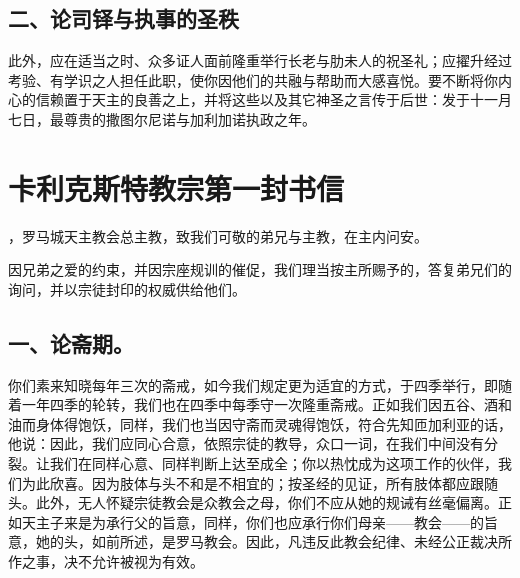 
\subsection{二、论司铎与执事的圣秩}

此外，应在适当之时、众多证人面前隆重举行长老与肋未人的祝圣礼；应擢升经过考验、有学识之人担任此职，使你因他们的共融与帮助而大感喜悦。要不断将你内心的信赖置于天主的良善之上，并将这些以及其它神圣之言传于后世：发于十一月七日，最尊贵的撒图尔尼诺与加利加诺执政之年。\par


\section{卡利克斯特教宗第一封书信}

\par

，罗马城天主教会总主教，致我们可敬的弟兄与主教，在主内问安。\par

因兄弟之爱的约束，并因宗座规训的催促，我们理当按主所赐予的，答复弟兄们的询问，并以宗徒封印的权威供给他们。\par


\subsection{一、论斋期。}

你们素来知晓每年三次的斋戒，如今我们规定更为适宜的方式，于四季举行，即随着一年四季的轮转，我们也在四季中每季守一次隆重斋戒。正如我们因五谷、酒和油而身体得饱饫，同样，我们也当因守斋而灵魂得饱饫，符合先知匝加利亚的话，他说：因此，我们应同心合意，依照宗徒的教导，众口一词，在我们中间没有分裂。让我们在同样心意、同样判断上达至成全；你以热忱成为这项工作的伙伴，我们为此欣喜。因为肢体与头不和是不相宜的；按圣经的见证，所有肢体都应跟随头。此外，无人怀疑宗徒教会是众教会之母，你们不应从她的规诫有丝毫偏离。正如天主子来是为承行父的旨意，同样，你们也应承行你们母亲——教会——的旨意，她的头，如前所述，是罗马教会。因此，凡违反此教会纪律、未经公正裁决所作之事，决不允许被视为有效。\par

